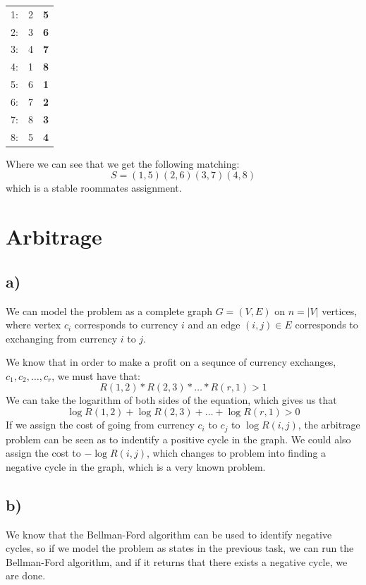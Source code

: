 \documentclass[a4paper]{article}
\begin{document}
\begin{center}
    \begin{tabular}{ | c || c  c  |}
          \hline
          1: & 2 & \textbf{5} \\
          2: & 3 & \textbf{6} \\
          3: & 4 & \textbf{7} \\
          4: & 1 & \textbf{8} \\
          5: & 6 & \textbf{1} \\
          6: & 7 & \textbf{2} \\
          7: & 8 & \textbf{3} \\
          8: & 5 & \textbf{4} \\
          \hline
    \end{tabular}
\end{center}
Where we can see that we get the following matching:
  $$ S=(1,5)(2,6)(3,7)(4,8) $$
which is a stable roommates assignment.

\section{Arbitrage}
\subsection*{a)}
We can model the problem as a complete graph $G=(V,E)$ on $n=|V|$ vertices, where vertex $c_i$ corresponds to currency $i$ and an edge $(i,j)\in E$ corresponds to exchanging from currency $i$ to $j$.

We know that in order to make a profit on a sequnce of currency exchanges, $c_1, c_2, \ldots, c_r$, we must have that:
$$
  R(1,2)*R(2,3)*\ldots*R(r,1)> 1
$$
We can take the logarithm of both sides of the equation, which gives us that
$$
  \log R(1,2) + \log R(2,3)+\ldots+\log R(r,1)> 0
$$
If we assign the cost of going from currency $c_i$ to $c_j$ to $\log R(i,j)$, the arbitrage problem can be seen as to indentify a positive cycle in the graph. We could also assign the cost to $-\log R(i,j)$, which changes to problem into finding a negative cycle in the graph, which is a very known problem.
\subsection*{b)}
We know that the Bellman-Ford algorithm can be used to identify negative cycles, so if we model the problem as states in the previous task, we can run the Bellman-Ford algorithm, and if it returns that there exists a negative cycle, we are done.
\end{document}
